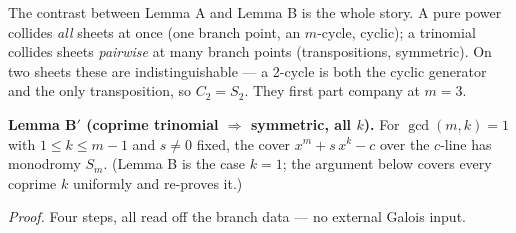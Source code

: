 \documentclass[11pt]{article}
\theoremstyle{plain}
\theoremstyle{definition}
\theoremstyle{remark}
\begin{document}
The contrast between Lemma A and Lemma B is the whole story. A pure power collides \emph{all} sheets at once (one branch point, an \(m\)-cycle, cyclic); a trinomial collides sheets \emph{pairwise} at many branch points (transpositions, symmetric). On two sheets these are indistinguishable --- a 2-cycle is both the cyclic generator and the only transposition, so \(C_2 = S_2\). They first part company at \(m=3\).

\textbf{Lemma B\('\) (coprime trinomial \(\Rightarrow\) symmetric, all \(k\)).} For \(\gcd(m,k)=1\) with \(1\le k\le m-1\) and \(s\neq0\) fixed, the cover \(x^m + s\,x^k - c\) over the \(c\)-line has monodromy \(S_m\). (Lemma B is the case \(k=1\); the argument below covers every coprime \(k\) uniformly and re-proves it.)

\emph{Proof.} Four steps, all read off the branch data --- no external Galois input.
\end{document}
